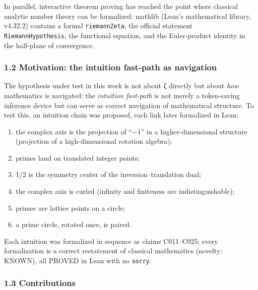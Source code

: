 \documentclass[
]{article}
\providecommand{\tightlist}{%
  \setlength{\itemsep}{0pt}\setlength{\parskip}{0pt}}
\begin{document}
In parallel, interactive theorem proving has reached the point where
classical analytic number theory can be formalized: mathlib (Lean's
mathematical library, v4.32.2) contains a formal \texttt{riemannZeta},
the official statement \texttt{RiemannHypothesis}, the functional
equation, and the Euler-product identity in the half-plane of
convergence.

\subsubsection{1.2 Motivation: the intuition fast-path as
navigation}\label{motivation-the-intuition-fast-path-as-navigation}

The hypothesis under test in this work is not about ζ directly but about
\emph{how} mathematics is navigated: the \emph{intuition fast-path} is
not merely a token-saving inference device but can serve as correct
navigation of mathematical structure. To test this, an intuition chain
was proposed, each link later formalized in Lean:

\begin{enumerate}
\def\labelenumi{\arabic{enumi}.}
\tightlist
\item
  the complex axis is the projection of ``−1'' in a higher-dimensional
  structure (projection of a high-dimensional rotation algebra);
\item
  primes land on translated integer points;
\item
  1/2 is the symmetry center of the inversion--translation dual;
\item
  the complex axis is curled (infinity and finiteness are
  indistinguishable);
\item
  primes are lattice points on a circle;
\item
  a prime circle, rotated once, is paired.
\end{enumerate}

Each intuition was formalized in sequence as claims C011--C025; every
formalization is a correct restatement of classical mathematics
(novelty: KNOWN), all PROVED in Lean with no \texttt{sorry}.

\subsubsection{1.3 Contributions}\label{contributions}
\end{document}

